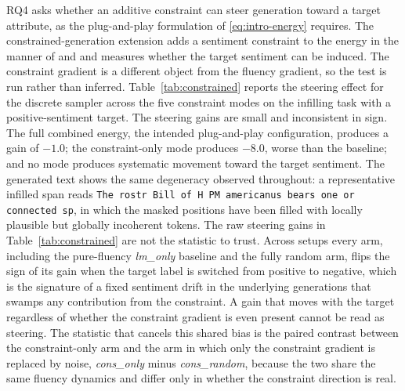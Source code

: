 RQ4 asks whether an additive constraint can steer generation toward a target attribute, as the plug-and-play formulation of \eqref{eq:intro-energy} requires. The constrained-generation extension adds a sentiment constraint to the energy in the manner of \citet{kumar2022gradient} and \citet{qin2022cold} and measures whether the target sentiment can be induced. The constraint gradient is a different object from the fluency gradient, so the test is run rather than inferred. Table~\ref{tab:constrained} reports the steering effect for the discrete sampler across the five constraint modes on the infilling task with a positive-sentiment target.
The steering gains are small and inconsistent in sign. The full combined energy, the intended plug-and-play configuration, produces a gain of $-1.0$; the constraint-only mode produces $-8.0$, worse than the baseline; and no mode produces systematic movement toward the target sentiment. The generated text shows the same degeneracy observed throughout: a representative infilled span reads \texttt{The rostr Bill of H PM americanus bears one or connected sp}, in which the masked positions have been filled with locally plausible but globally incoherent tokens.
The raw steering gains in Table~\ref{tab:constrained} are not the statistic to trust. Across setups every arm, including the pure-fluency \emph{lm\_only} baseline and the fully random arm, flips the sign of its gain when the target label is switched from positive to negative, which is the signature of a fixed sentiment drift in the underlying generations that swamps any contribution from the constraint. A gain that moves with the target regardless of whether the constraint gradient is even present cannot be read as steering. The statistic that cancels this shared bias is the paired contrast between the constraint-only arm and the arm in which only the constraint gradient is replaced by noise, \emph{cons\_only} minus \emph{cons\_random}, because the two share the same fluency dynamics and differ only in whether the constraint direction is real.

